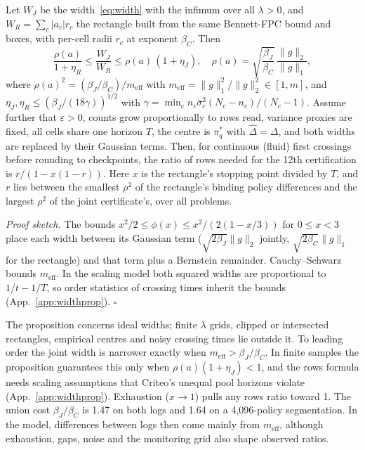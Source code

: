 \documentclass[sigconf,anonymous,review]{acmart}
\newcommand{\eps}{\varepsilon}
\newcommand{\meff}{m_{\text{eff}}}
\begin{document}
\begin{proposition}\label{prop:width}
Let $W_J$ be the width~\eqref{eq:width} with the infimum over all $\lambda>0$, and $W_R = \sum_c |a_c| r_c$ the rectangle built from the same Bennett-FPC bound and boxes, with per-cell radii $r_c$ at exponent $\beta_C$. Then
\[
\frac{\rho(a)}{1+\eta_R} \le \frac{W_J}{W_R} \le \rho(a)\,(1+\eta_J),\quad
\rho(a) = \sqrt{\frac{\beta_J}{\beta_C}}\,\frac{\|g\|_2}{\|g\|_1},
\]
where $\rho(a)^2 = (\beta_J/\beta_C)/\meff$ with $\meff = \|g\|_1^2/\|g\|_2^2 \in [1, m]$, and $\eta_J, \eta_R \le (\beta_J/(18\gamma))^{1/2}$ with $\gamma = \min_c n_c \bar\sigma_c^2 (N_c-n_c)/(N_c-1)$. Assume further that $\eps > 0$, counts grow proportionally to rows read, variance proxies are fixed, all cells share one horizon $T$, the centre is $\pi^*_q$ with $\hat\Delta = \Delta$, and both widths are replaced by their Gaussian terms. Then, for continuous (fluid) first crossings before rounding to checkpoints, the ratio of rows needed for the 12th certification is $r/(1 - x(1-r))$. Here $x$ is the rectangle's stopping point divided by $T$, and $r$ lies between the smallest $\rho^2$ of the rectangle's binding policy differences and the largest $\rho^2$ of the joint certificate's, over all problems.
\end{proposition}

\noindent\emph{Proof sketch.} The bounds $x^2/2 \le \phi(x) \le x^2/(2(1-x/3))$ for $0 \le x < 3$ place each width between its Gaussian term ($\sqrt{2\beta_J}\|g\|_2$ jointly, $\sqrt{2\beta_C}\|g\|_1$ for the rectangle) and that term plus a Bernstein remainder. Cauchy--Schwarz bounds $\meff$. In the scaling model both squared widths are proportional to $1/t - 1/T$, so order statistics of crossing times inherit the bounds (App.~\ref{app:widthprop}). $\square$

The proposition concerns ideal widths; finite $\lambda$ grids, clipped or intersected rectangles, empirical centres and noisy crossing times lie outside it. To leading order the joint width is narrower exactly when $\meff > \beta_J/\beta_C$. In finite samples the proposition guarantees this only when $\rho(a)(1+\eta_J) < 1$, and the rows formula needs scaling assumptions that Criteo's unequal pool horizons violate (App.~\ref{app:widthprop}). Exhaustion ($x \to 1$) pulls any rows ratio toward 1. The union cost $\beta_J/\beta_C$ is 1.47 on both logs and 1.64 on a 4,096-policy segmentation. In the model, differences between logs then come mainly from $\meff$, although exhaustion, gaps, noise and the monitoring grid also shape observed ratios.
\end{document}
